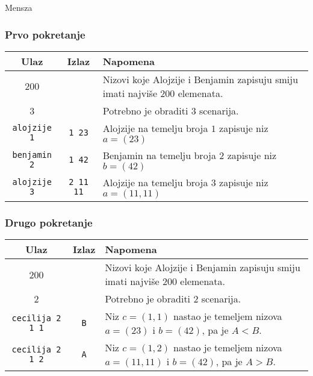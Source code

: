 \begin{statement}[
  problempoints=100,
  timelimit=5 sekundi,
  memorylimit=512 MiB,
]{Mensza}
\subsubsection*{Prvo pokretanje}
{\renewcommand{\arraystretch}{1.4}
  \setlength{\tabcolsep}{6pt}
  \begin{tabular}{ccl}
    Ulaz & Izlaz & Napomena \\ \midrule
     200 & & Nizovi koje Alojzije i Benjamin zapisuju smiju imati najviše $200$ elemenata. \\
     3   & & Potrebno je obraditi $3$ scenarija. \\
    \texttt{\frenchspacing alojzije 1} & \texttt{1 23} & Alojzije na temelju broja $1$ zapisuje niz $a = (23)$ \\
    \texttt{\frenchspacing benjamin 2} & \texttt{1 42} & Benjamin na temelju broja $2$ zapisuje niz $b = (42)$ \\
    \texttt{\frenchspacing alojzije 3} & \texttt{2 11 11} & Alojzije na temelju broja $3$ zapisuje niz $a = (11, 11)$ \\
\end{tabular}}

\subsubsection*{Drugo pokretanje}
{\renewcommand{\arraystretch}{1.4}
  \setlength{\tabcolsep}{6pt}
  \begin{tabular}{ccl}
    Ulaz & Izlaz & Napomena \\ \midrule
     200 & & Nizovi koje Alojzije i Benjamin zapisuju smiju imati najviše $200$ elemenata. \\
     2   & & Potrebno je obraditi $2$ scenarija. \\
    \texttt{\frenchspacing cecilija 2 1 1} & \texttt{B} & Niz $c = (1, 1)$ nastao je temeljem nizova $a = (23)$ i $b = (42)$, pa je $A < B$. \\
    \texttt{\frenchspacing cecilija 2 1 2} & \texttt{A} & Niz $c = (1, 2)$ nastao je temeljem nizova $a = (11, 11)$ i $b = (42)$, pa je $A > B$.\\
\end{tabular}}


\end{statement}

